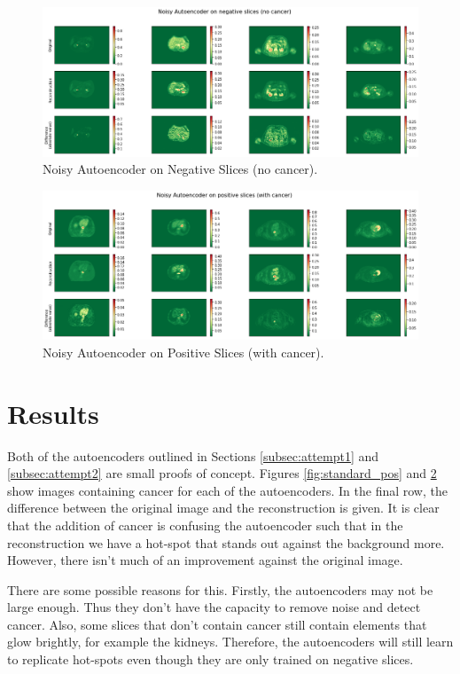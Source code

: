 \begin{figure}[hbtp!]
    \centering
    \includegraphics[width=\textwidth]{./img/noisy_negative.png}
    \caption{Noisy Autoencoder on Negative Slices (no cancer).}
    \label{fig:noisy_neg}
\end{figure}

\begin{figure}[hbtp!]
    \centering
    \includegraphics[width=\textwidth]{./img/noisy_positive.png}
    \caption{Noisy Autoencoder on Positive Slices (with cancer).}
    \label{fig:noisy_pos}
\end{figure}

\section{Results}
Both of the autoencoders outlined in Sections \ref{subsec:attempt1} and \ref{subsec:attempt2} are small proofs of concept.
Figures \ref{fig:standard_pos} and \ref{fig:noisy_pos} show images containing cancer for each of the autoencoders.
In the final row, the difference between the original image and the reconstruction is given.
It is clear that the addition of cancer is confusing the autoencoder such that in the reconstruction we have a hot-spot that stands out against the background more.
However, there isn't much of an improvement against the original image.

There are some possible reasons for this.
Firstly, the autoencoders may not be large enough.
Thus they don't have the capacity to remove noise and detect cancer.
Also, some slices that don't contain cancer still contain elements that glow brightly, for example the kidneys.
Therefore, the autoencoders will still learn to replicate hot-spots even though they are only trained on negative slices.

